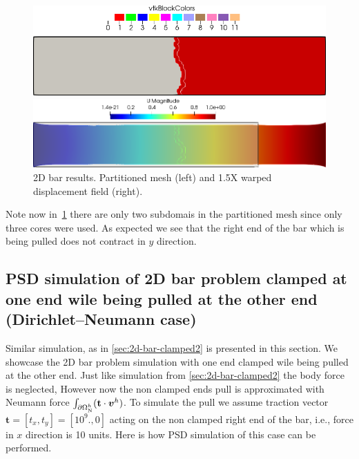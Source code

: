 \begin{figure}[htbp]
    \centering
    \begin{minipage}[t][2cm][t]{0.39\textwidth}
    \includegraphics[align=t,width=1\textwidth]{./Images/2d-bar-clamped-pulled-partioned.png}
    \end{minipage}\hspace{.1\textwidth}
    \begin{minipage}[t][2cm][t]{0.5\textwidth}
    \includegraphics[align=t,width=1\textwidth]{./Images/2d-bar-clamped-pulled.png}
    \end{minipage}
    \caption{2D bar results. Partitioned mesh (left) and 1.5X warped displacement field (right).}
    \label{fig:2part}
\end{figure}

Note now in~\cref{fig:2part} there are only two subdomais in the partitioned mesh since only three cores were used. As expected we see that the right end of the bar which is being pulled does not contract in $y$ direction.
\pagebreak


\subsection{PSD simulation of 2D bar problem clamped at one end wile being pulled at the other end (Dirichlet--Neumann case)\label{sec:2d-bar-clamped3}}


Similar simulation, as in \cref{sec:2d-bar-clamped2} is presented in this section. We showcase the 2D bar problem simulation with one end clamped wile being pulled at the other end. Just like simulation from \cref{sec:2d-bar-clamped2} the body force is neglected, However now  the non clamped ends pull is approximated with Neumann force $\int_{\partial\Omega^h_{\text N}}(\mathbf t\cdot \boldsymbol v^h)$. To simulate the pull we assume traction vector $\mathbf t=[t_x,t_y]=[10^9.,0]$ acting on the non clamped right end of the bar, i.e., force in $x$ direction is 10 units. Here is how PSD simulation of this case can be performed.

